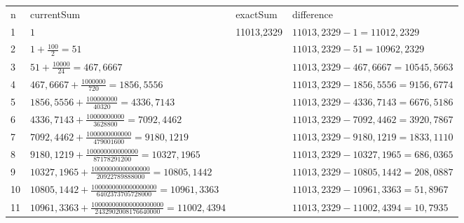 \documentclass[a4paper]{article}
\begin{document}
\begin{enumerate}[label=\textbf{Тест \arabic*},start=3]
		\hspace{-1cm}
		\begin{tabular}{l|l|l|l}
			n  & currentSum                                                                      & exactSum                     & difference                             \\
			1  & $ 1 $                                                                           & \multirow{11}{*}{11013,2329} & $ 11013,2329 - 1 = 11012,2329 $        \\
			2  & $ 1 + \frac{100}{2} = 51 $                                                      &                              & $ 11013,2329 - 51 = 10962,2329 $       \\
			3  & $ 51 + \frac{10000}{24} = 467,6667 $                                            &                              & $ 11013,2329 - 467,6667 = 10545,5663 $ \\
			4  & $ 467,6667 + \frac{1000000}{720} = 1856,5556 $                                  &                              & $ 11013,2329 - 1856,5556 = 9156,6774 $ \\
			5  & $ 1856,5556 + \frac{100000000}{40320} = 4336,7143 $                             &                              & $ 11013,2329 - 4336,7143 = 6676,5186 $ \\
			6  & $ 4336,7143 + \frac{10000000000}{3628800} = 7092,4462 $                         &                              & $ 11013,2329 - 7092,4462 = 3920,7867 $ \\
			7  & $ 7092,4462 + \frac{1000000000000}{479001600} = 9180,1219 $                     &                              & $ 11013,2329 - 9180,1219 = 1833,1110 $ \\
			8  & $ 9180,1219 + \frac{100000000000000}{87178291200} = 10327,1965 $                &                              & $ 11013,2329 - 10327,1965 = 686,0365 $ \\
			9  & $ 10327,1965 + \frac{10000000000000000}{20922789888000} = 10805,1442 $          &                              & $ 11013,2329 - 10805,1442 = 208,0887 $ \\
			10 & $ 10805,1442 + \frac{1000000000000000000}{6402373705728000} = 10961,3363 $      &                              & $ 11013,2329 - 10961,3363 = 51,8967 $  \\
			11 & $ 10961,3363 + \frac{100000000000000000000}{2432902008176640000} = 11002,4394 $ &                              & $ 11013,2329 - 11002,4394 = 10,7935 $
		\end{tabular}
		

\end{enumerate}
\end{document}
